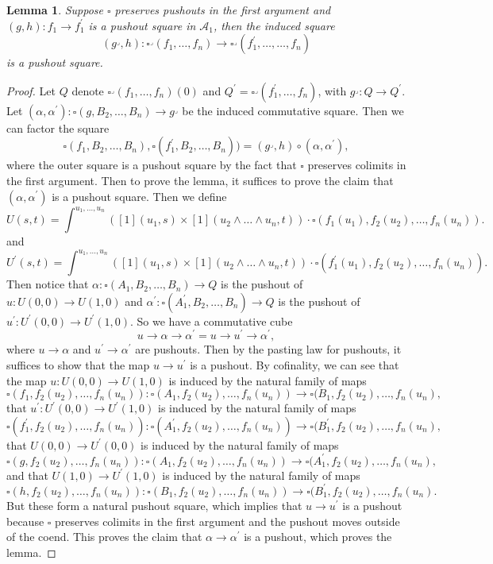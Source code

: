 \documentclass[leqno]{article}
\numberwithin{equation}{subsection}
\theoremstyle{plain}   %
\newtheorem{lemma}[equation]{Lemma}
\theoremstyle{remark}
\theoremstyle{plain}
\begin{document}
\begin{lemma}
	Suppose \(\square\) preserves pushouts in the first argument and \((g,h):f_1\to f_1^\prime\) is a pushout square in \(\mathcal{A}_1\), then the induced square 
	\[(g^\lrcorner,h):\square^\lrcorner(f_1,\dots,f_n) \to \square^\lrcorner(f^\prime_1,\dots,\dots,f_n) \] is a pushout square.
\end{lemma}
\begin{proof} 
	Let \(Q\) denote \(\square^\lrcorner(f_1,\dots,f_n)(0)\) and \(Q^\prime=\square^\lrcorner(f^\prime_1,\dots,f_n)\), with \(g^\lrcorner:Q\to Q^\prime\).  
	Let \((\alpha,\alpha^\prime): \square(g,B_2,\dots,B_n) \to g^\lrcorner\) be the induced commutative square. Then we can factor the square 
	\[\square(f_1,B_2,\dots,B_n),\square(f^\prime_1,B_2,\dots,B_n))=(g^\lrcorner,h)\circ (\alpha,\alpha^\prime),\]
	where the outer square is a pushout square by the fact that \(\square\) preserves colimits in the first argument. Then to prove the lemma, it suffices to prove the claim that \((\alpha,\alpha^\prime)\) is a pushout square.
	Then we define 
	\[U(s,t)=\int^{u_1,\dots,u_n} \left([1](u_1,s) \times [1](u_2\wedge\dots\wedge u_n,t)\right)\cdot \square(f_1(u_1),f_2(u_2),\dots, f_n(u_n)).\]
	and 
	\[U^\prime(s,t)=\int^{u_1,\dots,u_n} \left([1](u_1,s) \times [1](u_2\wedge\dots\wedge u_n,t)\right)\cdot \square(f^\prime_1(u_1),f_2(u_2),\dots, f_n(u_n)).\]
	Then notice that \(\alpha:\square(A_1,B_2,\dots,B_n) \to Q\) is the pushout of \(u:U(0,0)\to U(1,0)\) and \(\alpha^\prime:\square(A^\prime_1,B_2,\dots,B_n) \to Q\) is the pushout of \(u^\prime:U^\prime(0,0)\to U^\prime(1,0)\).  So we have a commutative cube 
	\[u\to \alpha \to \alpha^\prime = u\to u^\prime \to \alpha^\prime,\] where \(u\to \alpha\) and \(u^\prime\to \alpha^\prime\) are pushouts.  Then by the pasting law for pushouts, it suffices to show that the map \(u\to u^\prime\) is a pushout.  
	By cofinality, we can see that 
	the map \(u: U(0,0) \to U(1,0)\) is induced by the natural family of maps 
	\[\square(f_1,f_2(u_2),\dots, f_n(u_n)): \square(A_1,f_2(u_2),\dots, f_n(u_n))\to \square(B_1,f_2(u_2),\dots,f_n(u_n),\]
	that \(u^\prime:U^\prime(0,0)\to U^\prime(1,0)\) is induced by the natural family of maps
	\[\square(f^\prime_1,f_2(u_2),\dots, f_n(u_n)): \square(A^\prime_1,f_2(u_2),\dots, f_n(u_n))\to \square(B^\prime_1,f_2(u_2),\dots,f_n(u_n),\]
	that \(U(0,0)\to U^\prime(0,0)\) is induced by the natural family of maps
	\[\square(g,f_2(u_2),\dots, f_n(u_n)): \square(A_1,f_2(u_2),\dots, f_n(u_n))\to \square(A^\prime_1,f_2(u_2),\dots,f_n(u_n),\]
	and that \(U(1,0) \to U^\prime(1,0)\) is induced by the natural family of maps
	\[\square(h,f_2(u_2),\dots, f_n(u_n)): \square(B_1,f_2(u_2),\dots, f_n(u_n))\to \square(B^\prime_1,f_2(u_2),\dots,f_n(u_n).\]
	But these form a natural pushout square, which implies that \(u\to u^\prime\) is a pushout because \(\square\) preserves colimits in the first argument and the pushout moves outside of the coend.  This proves the claim that \(\alpha\to \alpha^\prime\) is a pushout, which proves the lemma.
\end{proof}
\end{document}
